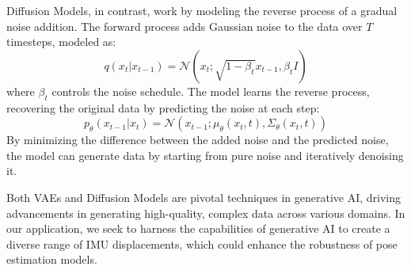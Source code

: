 Diffusion Models, in contrast, work by modeling the reverse process of a gradual noise addition. The forward process adds Gaussian noise to the data over \(T\) timesteps, modeled as:
\begin{equation}
q(x_t|x_{t-1}) = \mathcal{N}(x_t; \sqrt{1 - \beta_t}x_{t-1}, \beta_t I)
\end{equation}
where \(\beta_t\) controls the noise schedule. The model learns the reverse process, recovering the original data by predicting the noise at each step:
\begin{equation}
\label{eq:sample}
p_\theta(x_{t-1}|x_t) = \mathcal{N}(x_{t-1}; \mu_\theta(x_t, t), \Sigma_\theta(x_t, t))
\end{equation}
By minimizing the difference between the added noise and the predicted noise, the model can generate data by starting from pure noise and iteratively denoising it.

Both VAEs and Diffusion Models are pivotal techniques in generative AI, driving advancements in generating high-quality, complex data across various domains. In our application, we seek to harness the capabilities of generative AI to create a diverse range of IMU displacements, which could enhance the robustness of pose estimation models.